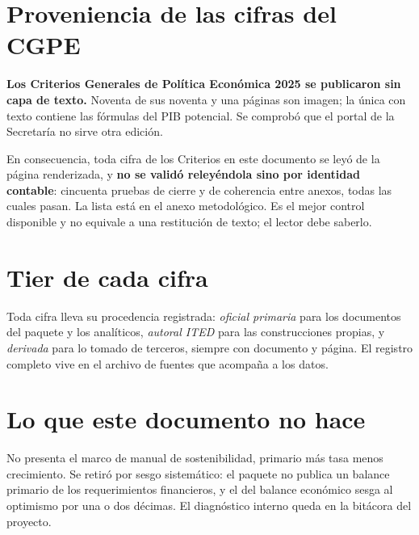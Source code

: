 \section*{Proveniencia de las cifras del CGPE}

\textbf{Los Criterios Generales de Política Económica 2025 se publicaron sin capa
de texto.} Noventa de sus noventa y una páginas son imagen; la única con texto
contiene las fórmulas del PIB potencial. Se comprobó que el portal de la
Secretaría no sirve otra edición.

En consecuencia, toda cifra de los Criterios en este documento se leyó de la
página renderizada, y \textbf{no se validó releyéndola sino por identidad
contable}: cincuenta pruebas de cierre y de coherencia entre anexos, todas las
cuales pasan. La lista está en el anexo metodológico. Es el mejor control
disponible y no equivale a una restitución de texto; el lector debe saberlo.

\section*{Tier de cada cifra}

Toda cifra lleva su procedencia registrada: \emph{oficial primaria} para los
documentos del paquete y los analíticos, \emph{autoral ITED} para las
construcciones propias, y \emph{derivada} para lo tomado de terceros, siempre con
documento y página. El registro completo vive en el archivo de fuentes que
acompaña a los datos.

\section*{Lo que este documento no hace}

No presenta el marco de manual de sostenibilidad, primario más tasa menos
crecimiento. Se retiró por sesgo sistemático: el paquete no publica un balance
primario de los requerimientos financieros, y el del balance económico sesga al
optimismo por una o dos décimas. El diagnóstico interno queda en la bitácora del
proyecto.

\clearpage
